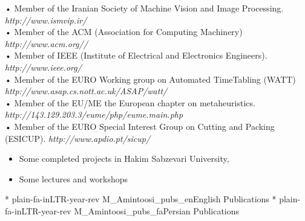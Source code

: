 \documentclass[10pt,a4paper]{moderncv}
\begin{document}
{\small • Member of the Iranian Society of Machine Vision and Image Processing. \hfill {\scriptsize\em http://www.ismvip.ir/}}\\
{\small • Member of the ACM (Association for Computing Machinery) \hfill {\scriptsize\em http://www.acm.org//}}\\
{\small • Member of IEEE (Institute of Electrical and Electronics Engineers). \hfill {\scriptsize\em http://www.ieee.org/}}\\
{\small • Member of the EURO Working group on Automated TimeTabling (WATT) \hfill {\scriptsize\em http://www.asap.cs.nott.ac.uk/ASAP/watt/}}\\
{\small • Member of the EU/ME the European chapter on metaheuristics. \hfill {\scriptsize\em http://143.129.203.3/eume/php/eume.main.php}}\\
{\small • Member of the EURO Special Interest Group on Cutting and Packing (ESICUP). \hfill {\scriptsize\em http://www.apdio.pt/sicup/}}\\

\begin{itemize}
\item Some completed projects in Hakim Sabzevari University, 
\item Some lectures and workshops%
\end{itemize}





\nocite{pubEn}{*}
{plain-fa-inLTR-year-rev}
{M_Amintoosi_pubs_en}{English Publications}
\nocite{pubFa}{*}
{plain-fa-inLTR-year-rev}
{M_Amintoosi_pubs_fa}{Persian Publications}

%
%

%
%
%
\end{document}
